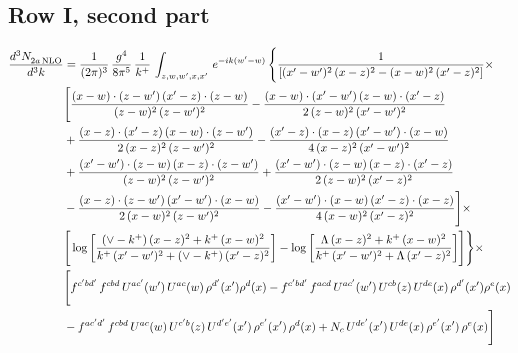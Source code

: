 \documentclass[9pt]{article}
\numberwithin{equation}{section}
\begin{document}
\subsection{Row I, second part}

\begin{align} 
    \frac{d^{3}N_{2a\,\rm NLO}^{\rm}}{d^{3}k}  & = \frac{1}{(2\pi)^{3}}\, \frac{g^{4}}{8\pi^{5}}\,\frac{1}{k^{+}}\,\int_{z,w,w^{\prime},x,x'}\, e^{-ik(w^{\prime}-w)}\, \Bigg\{\frac{1}{\left[(x'-w')^{2}\, (x-z)^{2}-(x-w)^{2}\, (x'-z)^{2}\right]}\times\,\notag \\ & \Bigg[\frac{(x-w)\cdot (z-w')\, (x'-z)\cdot (z-w)}{(z-w)^{2}\,(z-w')^{2}}-\frac{(x-w)\cdot (x'-w')\, (z-w)\cdot (x'-z)}{2\, (z-w)^{2}\, (x'-w')^{2}}\notag \\ & + \frac{(x-z)\cdot (x'-z)\, (x-w)\cdot (z-w')}{2\, (x-z)^{2}\, (z-w')^{2}}-\frac{(x'-z)\cdot (x-z)\, (x'-w')\cdot (x-w)}{4\, (x-z)^{2}\, (x'-w')^{2}}\notag \\ & + \frac{(x'-w')\cdot (z-w)\, (x-z)\cdot (z-w')}{(z-w)^{2}\,(z-w')^{2}}+\frac{(x'-w')\cdot (z-w)\, (x-z)\cdot (x'-z)}{2\, (z-w)^{2}\, (x'-z)^{2}}\notag \\ & - \frac{(x-z)\cdot (z-w')\, (x'-w')\cdot (x-w)}{2\, (x-w)^{2}\, (z-w')^{2}} -\frac{(x'-w')\cdot (x-w)\, (x'-z)\cdot (x-z)}{4\, (x-w)^{2}\, (x'-z)^{2}}\Bigg]\times\notag \\ &  \Bigg[\log{\left[\frac{(\vee-k^{+})\,(x-z)^{2}+k^{+}\,(x-w)^{2}}{k^{+}\, (x'-w')^{2} + (\vee-k^{+})\, (x'-z)^{2}}\right]}-\log{\left[\frac{\Lambda\,(x-z)^{2}+k^{+}\,(x-w)^{2}}{k^{+}\, (x'-w')^{2} + \Lambda\, (x'-z)^{2}}\right]}\Bigg] \Bigg\} \times\, \notag \\ & \Bigg[f^{c'bd'}\,f^{cbd}\, U^{ac'}(w')\,U^{ac}(w)\,\rho^{d'}(x')\rho^{d}(x)- f^{c'bd'}\,f^{acd}\,U^{ac'}(w')\,U^{cb}(z)\,U^{de}(x)\,\rho^{d'}(x')\rho^{e}(x) \notag \\ & -f^{ac'd'}\,f^{cbd}\,U^{ac}(w)\,U^{c'b}(z)\,U^{d'e'}(x')\,\rho^{e'}(x')\,\rho^{d}(x) +N_{c}\,U^{de'}(x')\,U^{de}(x)\,\rho^{e'}(x')\,\rho^{e}(x)\Bigg]
\end{align}
\end{document}
